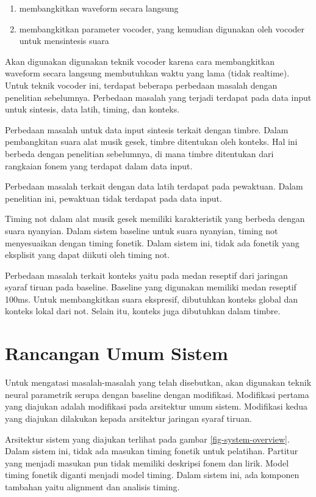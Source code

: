 \begin{enumerate}
	\item membangkitkan waveform secara langsung
	\item membangkitkan parameter vocoder, yang kemudian digunakan oleh vocoder untuk mensintesis suara
\end{enumerate}

Akan digunakan digunakan teknik vocoder karena cara membangkitkan waveform secara langsung membutuhkan waktu yang lama (tidak realtime). Untuk teknik vocoder ini, terdapat beberapa perbedaan masalah dengan penelitian sebelumnya\parencite{bonada2017singing}. Perbedaan masalah yang terjadi terdapat pada data input untuk sintesis, data latih, timing, dan konteks.

Perbedaan masalah untuk data input sintesis terkait dengan timbre. Dalam pembangkitan suara alat musik gesek, timbre ditentukan oleh konteks. Hal ini berbeda dengan penelitian sebelumnya, di mana timbre ditentukan dari rangkaian fonem yang terdapat dalam data input.

Perbedaan masalah terkait dengan data latih terdapat pada pewaktuan. Dalam penelitian ini, pewaktuan tidak terdapat pada data input.

Timing not dalam alat musik gesek memiliki karakteristik yang berbeda dengan suara nyanyian. Dalam sistem baseline untuk suara nyanyian, timing not menyesuaikan dengan timing fonetik. Dalam sistem ini, tidak ada fonetik yang eksplisit yang dapat diikuti oleh timing not.

Perbedaan masalah terkait konteks yaitu pada medan reseptif dari jaringan syaraf tiruan pada baseline. Baseline yang digunakan memiliki medan reseptif 100ms. Untuk membangkitkan suara ekspresif, dibutuhkan konteks global dan konteks lokal dari not. Selain itu, konteks juga dibutuhkan dalam timbre.

\section{Rancangan Umum Sistem}

Untuk mengatasi masalah-masalah yang telah disebutkan, akan digunakan teknik neural parametrik serupa dengan baseline\parencite{bonada2017singing} dengan modifikasi. Modifikasi pertama yang diajukan adalah modifikasi pada arsitektur umum sistem. Modifikasi kedua yang diajukan dilakukan kepada arsitektur jaringan syaraf tiruan.

Arsitektur sistem yang diajukan terlihat pada gambar \ref{fig-system-overview}. Dalam sistem ini, tidak ada masukan timing fonetik untuk pelatihan. Partitur yang menjadi masukan pun tidak memiliki deskripsi fonem dan lirik. Model timing fonetik diganti menjadi model timing. Dalam sistem ini, ada komponen tambahan yaitu alignment dan analisis timing.


